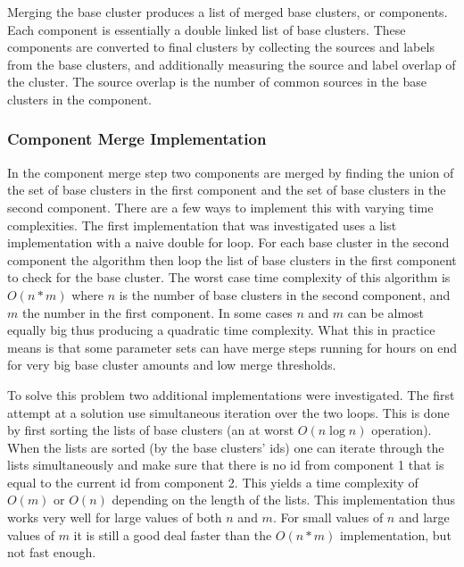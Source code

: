 Merging the base cluster produces a list of merged base clusters, or components. Each component is essentially a double linked list of base clusters. These components are converted to final clusters by collecting the sources and labels from the base clusters, and additionally measuring the source and label overlap of the cluster. The source overlap is the number of common sources in the base clusters in the component.

\subsubsection{Component Merge Implementation}
In the component merge step two components are merged by finding the union of the set of base clusters in the first component and the set of base clusters in the second component. There are a few ways to implement this with varying time complexities. The first implementation that was investigated uses a list implementation with a naive double for loop. For each base cluster in the second component the algorithm then loop the list of base clusters in the first component to check for the base cluster. The worst case time complexity of this algorithm is \(O(n*m)\) where \(n\) is the number of base clusters in the second component, and \(m\) the number in the first component. In some cases \(n\) and \(m\) can be almost equally big thus producing a quadratic time complexity. What this in practice means is that some parameter sets can have merge steps running for hours on end for very big base cluster amounts and low merge thresholds.

To solve this problem two additional implementations were investigated. The first attempt at a solution use simultaneous iteration over the two loops. This is done by first sorting the lists of base clusters (an at worst \(O(n \log n)\) operation). When the lists are sorted (by the base clusters' ids) one can iterate through the lists simultaneously and make sure that there is no id from component 1 that is equal to the current id from component 2. This yields a time complexity of \(O(m)\) or \(O(n)\) depending on the length of the lists. This implementation thus works very well for large values of both \(n\) and \(m\). For small values of \(n\) and large values of \(m\) it is still a good deal faster than the \(O(n*m)\) implementation, but not fast enough.

